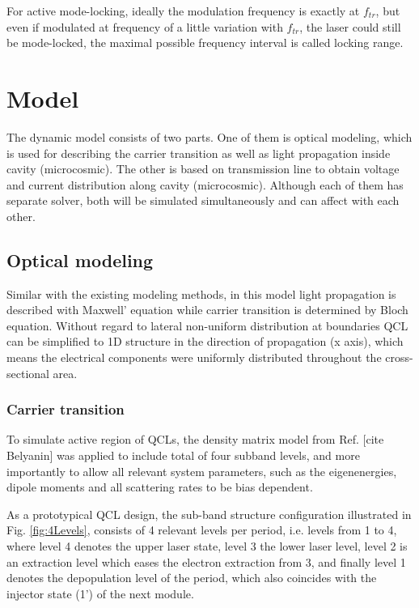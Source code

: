 \documentclass[11pt,final]{scrbook}
\begin{document}
For active mode-locking, ideally the modulation frequency is exactly at $ f_{tr}$, but even if modulated at frequency of a little variation with $ f_{tr}$, the laser could still be mode-locked, the maximal possible frequency interval is called locking range.
\chapter{Model}
The dynamic model consists of two parts. One of them is optical modeling, which is used for describing the carrier transition  as well as light propagation inside cavity (microcosmic). The other is based on transmission line to obtain voltage and current distribution along cavity (microcosmic). Although each of them has separate solver, both will be simulated simultaneously and can affect with each other.
\section{Optical modeling}
Similar with the existing modeling methods, in this model light propagation is described with Maxwell' equation while carrier transition is determined by Bloch equation. Without regard to lateral non-uniform distribution at boundaries \cite{huang2014non, dhar2015nanoscopic} QCL can be simplified to 1D structure in the direction of propagation (x axis), which means the electrical components were uniformly distributed throughout the cross-sectional area. 

\subsection{Carrier transition}
To simulate active region of QCLs, the density matrix model from Ref. [cite Belyanin] was applied to include total of four subband levels, and more importantly to allow all relevant system parameters, such as the eigenenergies, dipole moments and all scattering rates to be bias dependent. 

As a prototypical QCL design, the sub-band structure configuration illustrated in Fig. \ref{fig:4Levels}, consists of 4 relevant levels per period, i.e. levels from 1 to 4, where level 4 denotes the upper laser state, level 3 the lower laser level, level 2 is an extraction level which eases the electron extraction from 3, and finally level 1 denotes the depopulation level of the period, which also coincides with the injector state (1') of the next module. 
\end{document}
